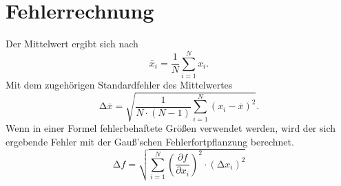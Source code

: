 \section{Fehlerrechnung}
\label{Fehlerrechnung}

Der Mittelwert ergibt sich nach
\begin{equation}
  \bar{x}_i = \frac{1}{N} \sum_{i=1}^N x_i .
  \label{eqn:Mittelwert}
\end{equation}
Mit dem zugehörigen Standardfehler des Mittelwertes
\begin{equation}
  \increment\bar{x} = \sqrt{\frac{1} {N\cdot (N-1)}
    \sum_{i=1}^N (x_i - \bar{x})^2} .
  \label{eqn:Mittelwertfehler}
\end{equation}
Wenn in einer Formel fehlerbehaftete Größen verwendet werden, wird der sich
ergebende Fehler mit der Gauß'schen Fehlerfortpflanzung berechnet.
\begin{equation}
  \increment f = \sqrt{\sum_{i=1}^N \left(\frac{\partial f} {\partial x_i}\right)^2
    \cdot (\increment x_i)^2}
  \label{eqn:Fehlerfortpflanzung}
\end{equation}
